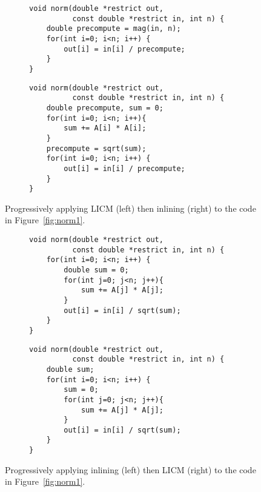 \begin{figure*}[h]
     \centering
     \begin{subfigure}[b]{0.46\textwidth}
         \centering
\begin{verbatim}
void norm(double *restrict out,
          const double *restrict in, int n) {
    double precompute = mag(in, n);
    for(int i=0; i<n; i++) {
        out[i] = in[i] / precompute;
    }
}
\end{verbatim}
\end{subfigure}
     \hfill
     \begin{subfigure}[b]{0.46\textwidth}
         \centering
\begin{verbatim}
void norm(double *restrict out,
          const double *restrict in, int n) {
    double precompute, sum = 0;
    for(int i=0; i<n; i++){
        sum += A[i] * A[i];
    }
    precompute = sqrt(sum);
    for(int i=0; i<n; i++) {
        out[i] = in[i] / precompute;
    }
}
\end{verbatim}
     \end{subfigure}
     \vspace{-0.2cm}
     \caption{Progressively applying LICM (left) then inlining (right) to the code in Figure~\ref{fig:norm1}.}
    \label{fig:norm2}
    \vspace{-0.4cm}
\end{figure*}
\begin{figure*}[!h]
     \centering
     \begin{subfigure}[b]{0.46\textwidth}
         \centering
\begin{verbatim}
void norm(double *restrict out,
          const double *restrict in, int n) {
    for(int i=0; i<n; i++) {
        double sum = 0;
        for(int j=0; j<n; j++){
            sum += A[j] * A[j];
        }
        out[i] = in[i] / sqrt(sum);
    }
}
\end{verbatim}
\end{subfigure}
     \hfill
     \begin{subfigure}[b]{0.46\textwidth}
         \centering
\begin{verbatim}
void norm(double *restrict out,
          const double *restrict in, int n) {
    double sum;
    for(int i=0; i<n; i++) {
        sum = 0;
        for(int j=0; j<n; j++){
            sum += A[j] * A[j];
        }
        out[i] = in[i] / sqrt(sum);
    }
}
\end{verbatim}
     \end{subfigure}
          \vspace{-0.3cm}
     \caption{Progressively applying inlining (left) then LICM (right) to the code in Figure~\ref{fig:norm1}.}
     \label{fig:norm3}
     \vspace{-0.5cm}
\end{figure*}



